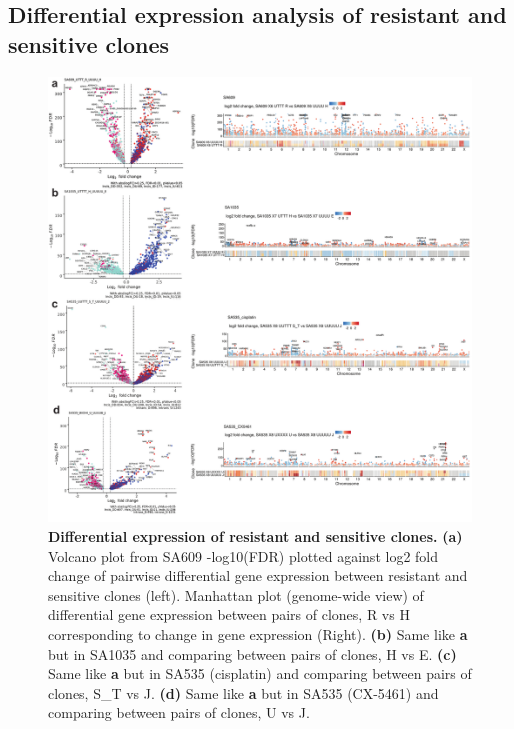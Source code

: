 \subsection{Differential expression  analysis of resistant and sensitive clones}




\begin{figure}
\centering
  \includegraphics[width=\textwidth]{Figures/fig4_Volcanotrackplots.pdf}
\caption[DE of resistant and sensitive clonealign defined clones]
	{\small
	\textbf{Differential expression of resistant and sensitive clones.}
	\textbf{(a)} Volcano plot from SA609 -log10(FDR) plotted against log2 fold change of pairwise differential gene expression between resistant and sensitive clones (left). Manhattan plot (genome-wide view) of differential gene expression between pairs of clones, R vs H corresponding to change in gene expression (Right).
	    \textbf{(b)} Same like \textbf{a} but in SA1035 and comparing between pairs of clones, H vs E. 
	     \textbf{(c)} Same like \textbf{a} but in SA535 (cisplatin) and comparing between pairs of clones, S\_T vs J. 
	     \textbf{(d)} Same like \textbf{a} but in SA535 (CX-5461) and comparing between pairs of clones, U vs J.}
	
	\label{fig:fig4_Volcanotrackplots}
\end{figure}




